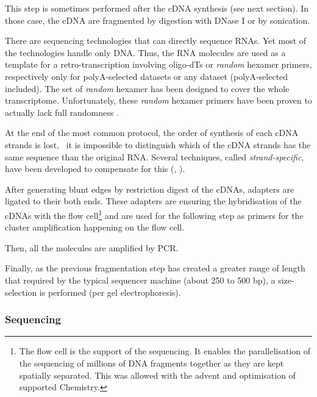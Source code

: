 This step is sometimes performed after the \gls{cDNA} synthesis (see next section).
In those case, the \gls{cDNA} are fragmented by digestion with DNase I or by
sonication.

There are sequencing technologies that can directly sequence \glspl{RNA}. Yet
most of the technologies handle only \gls{DNA}. Thus, the \gls{RNA}
molecules are used as a template for a retro-transcription involving
oligo-dTs or \emph{random} hexamer primers, respectively only for polyA-selected
datasets or any dataset (polyA-selected included). The set of \emph{random}
hexamer has been designed to cover the whole transcriptome. Unfortunately,
these \emph{random} hexamer primers have been proven to actually lack full
randomness .

At the end of the most common protocol, the order of synthesis of each \gls{cDNA}
strands is lost, \ie\ it is impossible to distinguish which of the \gls{cDNA}
strands has the same sequence than the original \gls{RNA}. Several techniques,
called \emph{strand-specific}, have been developed to compensate for this
(, ).

After generating blunt edges by restriction digest of the \glspl{cDNA}, adapters
are ligated to their both ends. These adapters are ensuring the hybridisation of
the \glspl{cDNA} with the flow cell\footnote{The flow cell is the support of the
sequencing. It enables the parallelisation of the sequencing of millions of
\gls{DNA} fragments together as they are kept spatially separated. This was
allowed with the advent and optimisation of supported Chemistry.}
and are used for the following step as primers for the cluster amplification
happening  on the flow cell.

Then, all the molecules are amplified by \gls{PCR}.

Finally, as the previous fragmentation step has created a greater range of length
that required by the typical sequencer machine (about 250 to 500 bp), a
size-selection is performed (per gel electrophoresis).


\subsubsection{Sequencing}


